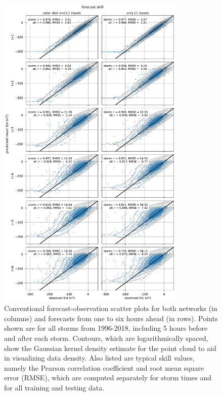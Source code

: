\documentclass{agujournal2018}
\begin{document}
\begin{figure}[htbp]
  \centering
  \includegraphics[width=0.8\textwidth]{figures/supplement/scatter.pdf} 
  \caption{Conventional forecast-observation scatter plots for both networks (in columns) and forecasts from one to six hours ahead (in rows). Points shown are for all storms from 1996-2018, including 5 hours before and after each storm. Contours, which are logarithmically spaced, show the Gaussian kernel density estimate for the point cloud to aid in visualizing data density. Also listed are typical skill values, namely the Pearson correlation coefficient and root mean square error (RMSE), which are computed separately for storm times and for all training and testing data.}
  \label{fig:scatter}
\end{figure}
\end{document}
